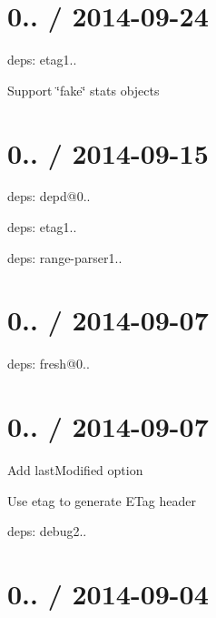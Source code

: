 \section*{0.. / 2014-\/09-\/24 }


\begin{DoxyItemize}
\item deps\+: etag1..
\begin{DoxyItemize}
\item Support \char`\"{}fake\char`\"{} stats objects
\end{DoxyItemize}
\end{DoxyItemize}

\section*{0.. / 2014-\/09-\/15 }


\begin{DoxyItemize}
\item deps\+: depd@0..
\item deps\+: etag1..
\item deps\+: range-\/parser1..
\end{DoxyItemize}

\section*{0.. / 2014-\/09-\/07 }


\begin{DoxyItemize}
\item deps\+: fresh@0..
\end{DoxyItemize}

\section*{0.. / 2014-\/09-\/07 }


\begin{DoxyItemize}
\item Add {\ttfamily last\+Modified} option
\item Use {\ttfamily etag} to generate {\ttfamily E\+Tag} header
\item deps\+: debug2..
\end{DoxyItemize}

\section*{0.. / 2014-\/09-\/04 }


